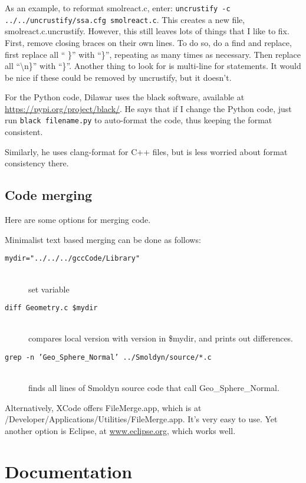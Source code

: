 \documentclass {scrbook}
\newcommand {\ttt} {\texttt}
\begin{document}
As an example, to reformat smolreact.c, enter: \ttt{uncrustify -c ../../uncrustify/ssa.cfg smolreact.c}. This creates a new file, smolreact.c.uncrustify. However, this still leaves lots of things that I like to fix. First, remove closing braces on their own lines. To do so, do a find and replace, first replace all `` \}'' with ``\}'', repeating as many times as necessary. Then replace all ``\textbackslash n\}'' with ``\}''. Another thing to look for is multi-line for statements. It would be nice if these could be removed by uncrustify, but it doesn't.

For the Python code, Dilawar uses the black software, available at \url{https://pypi.org/project/black/}. He says that if I change the Python code, just run \ttt{black filename.py} to auto-format the code, thus keeping the format consistent.

Similarly, he uses clang-format for C++ files, but is less worried about format consistency there.


\subsection{Code merging}

Here are some options for merging code.

Minimalist text based merging can be done as follows:

\begin{description}
\item[\ttt{mydir="../../../gccCode/Library"}]
\hfill \\
set variable
\item[\ttt{diff Geometry.c \$mydir}]
\hfill \\
compares local version with version in \$mydir, and prints out differences.
\item[\ttt{grep -n 'Geo\_Sphere\_Normal' ../Smoldyn/source/*.c}]
\hfill \\
finds all lines of Smoldyn source code that call Geo\_Sphere\_Normal.
\end{description}

Alternatively, XCode offers FileMerge.app, which is at /Developer/Applications/Utilities/FileMerge.app. It's very easy to use. Yet another option is Eclipse, at \url{www.eclipse.org}, which works well.

\section{Documentation}
\end{document}
